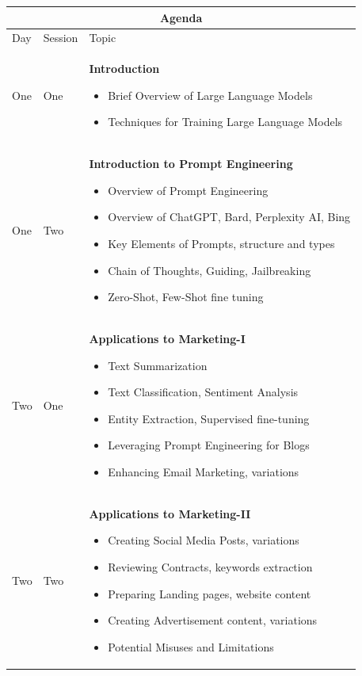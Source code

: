 \documentclass[a4paper, 11pt]{article}
\begin{document}
\begin{center} 
\begin{tabular}{ |p{1cm}|p{1cm}||p{10cm}|  }
 \hline
 \multicolumn{3}{|c|}{\textbf{\large Agenda}} \\
 \hline
Day & Session & Topic\\
 \hline
 One   &  One    &  \textbf{Introduction}
\begin{itemize}[itemsep=0pt]
\item Brief Overview of Large Language Models
\item Techniques for Training Large Language Models
\end{itemize} 
\\
One &   Two  &   \textbf{Introduction to Prompt Engineering}
 \begin{itemize}[itemsep=0pt]
\item Overview of Prompt Engineering
\item Overview of ChatGPT, Bard, Perplexity AI, Bing
\item Key Elements of Prompts, structure and types
\item Chain of Thoughts, Guiding, Jailbreaking
\item Zero-Shot, Few-Shot fine tuning
\end{itemize} 
\\
Two   &  One    & \textbf{Applications to Marketing-I}
 \begin{itemize}[itemsep=0pt]
\item Text Summarization
\item Text Classification, Sentiment Analysis
\item Entity Extraction, Supervised fine-tuning
\item Leveraging Prompt Engineering for Blogs
\item Enhancing Email Marketing, variations
\end{itemize} 
\\
Two  &   Two  & \textbf{Applications to Marketing-II}
 \begin{itemize}[itemsep=0pt]
 \item Creating Social Media Posts, variations
\item Reviewing Contracts, keywords extraction
\item Preparing Landing pages, website content
\item Creating Advertisement content, variations
\item Potential Misuses and Limitations 
\end{itemize} 
\\
 \hline
\end{tabular}
\end{center}
\end{document}
